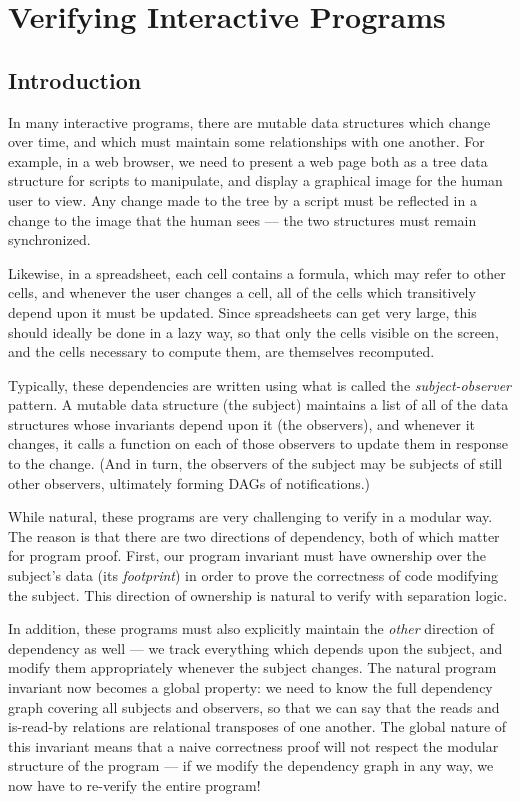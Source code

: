 \chapter{Verifying Interactive Programs}

\section{Introduction}

In many interactive programs, there are mutable data structures which
change over time, and which must maintain some relationships with one
another. For example, in a web browser, we need to present a web page
both as a tree data structure for scripts to manipulate, and display a
graphical image for the human user to view. Any change made to the
tree by a script must be reflected in a change to the image that the
human sees --- the two structures must remain synchronized.

Likewise, in a spreadsheet, each cell contains a formula, which may
refer to other cells, and whenever the user changes a cell, all of the
cells which transitively depend upon it must be updated. Since
spreadsheets can get very large, this should ideally be done in a lazy
way, so that only the cells visible on the screen, and the cells
necessary to compute them, are themselves recomputed.

Typically, these dependencies are written using what is called the
\emph{subject-observer} pattern. A mutable data structure (the
subject) maintains a list of all of the data structures whose
invariants depend upon it (the observers), and whenever it changes, it
calls a function on each of those observers to update them in response
to the change. (And in turn, the observers of the subject may be
subjects of still other observers, ultimately forming DAGs of
notifications.)

While natural, these programs are very challenging to verify in a
modular way. The reason is that there are two directions of
dependency, both of which matter for program proof. First, our program
invariant must have ownership over the subject's data (its
\emph{footprint}) in order to prove the correctness of code modifying
the subject. This direction of ownership is natural to verify with
separation logic.

In addition, these programs must also explicitly maintain the
\emph{other} direction of dependency as well --- we track everything
which depends upon the subject, and modify them appropriately whenever
the subject changes.  The natural program invariant now becomes a
global property: we need to know the full dependency graph covering
all subjects and observers, so that we can say that the reads and
is-read-by relations are relational transposes of one another. The
global nature of this invariant means that a naive correctness proof
will not respect the modular structure of the program --- if we modify
the dependency graph in any way, we now have to re-verify the entire
program!

